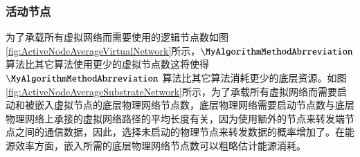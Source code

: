 \subsubsection{活动节点}
为了承载所有虚拟网络而需要使用的逻辑节点数如图\ref{fig:ActiveNodeAverageVirtualNetwork}所示，$\MyAlgorithmMethodAbrreviation$ 算法比其它算法使用更少的虚拟节点数这将使得$\MyAlgorithmMethodAbrreviation$ 算法比其它算法消耗更少的底层资源。如图\ref{fig:ActiveNodeAverageSubstrateNetwork}所示，为了承载所有虚拟网络而需要启动和被嵌入虚拟节点的底层物理网络节点数，底层物理网络需要启动节点数与底层物理网络上承接的虚拟网络路径的平均长度有关，因为使用额外的节点来转发端节点之间的通信数据，因此，选择未启动的物理节点来转发数据的概率增加了。在能源效率方面，嵌入所需的底层物理网络节点数可以粗略估计能源消耗。

